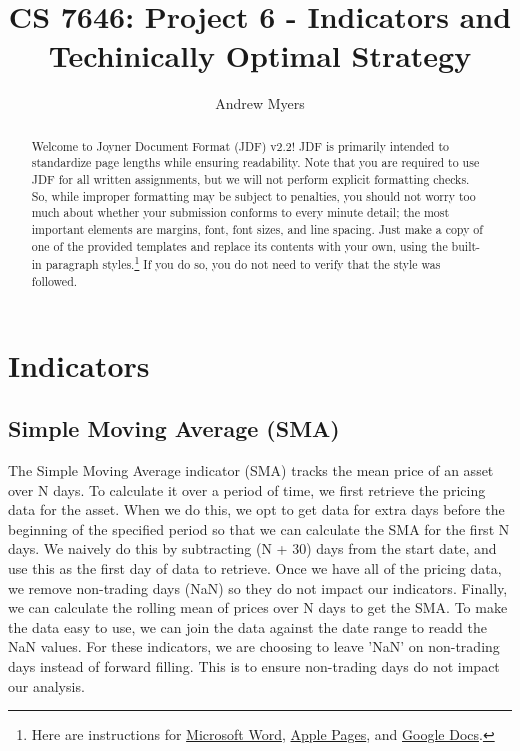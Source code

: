\documentclass[
	letterpaper, %
]{jdf}
\author{Andrew Myers}
\title{CS 7646: Project 6 - Indicators and Techinically Optimal Strategy}
\begin{document}

\maketitle

\begin{abstract}
	Welcome to Joyner Document Format (JDF) v2.2! JDF is primarily intended to standardize page lengths while ensuring readability. 
	Note that you are required to use JDF for all written assignments, but we will not perform explicit formatting checks. 
	So, while improper formatting may be subject to penalties, you should not worry too much about whether your submission conforms to 
	every minute detail; the most important elements are margins, font, font sizes, and line spacing. Just make a copy of one of the provided templates 
	and replace its contents with your own, using the built-in paragraph styles.\footnote{Here are instructions for 
	\href{https://support.office.com/en-us/article/Video-Using-Styles-in-Word-9db4c0f4-2754-4294-9758-c14a0abd8cfa}{Microsoft Word}, 
	\href{https://support.apple.com/guide/pages/intro-to-paragraph-styles-tanaa39b0aa3/mac}{Apple Pages}, and 
	\href{https://www.bazroberts.com/2016/04/19/google-docs-paragraph-styles-headings/}{Google Docs}.} If you do so, you do not need to verify that the style was followed.
\end{abstract}

\section{Indicators}
\subsection{Simple Moving Average (SMA)}
The Simple Moving Average indicator (SMA) tracks the mean price of an asset over N days. To calculate it over a period of time, we first retrieve the pricing data for the asset.
When we do this, we opt to get data for extra days before the beginning of the specified period so that we can calculate the SMA for the first N days. 
We naively do this by subtracting (N + 30) days from the start date, and use this as the first day of data to retrieve.
Once we have all of the pricing data, we remove non-trading days (NaN) so they do not impact our indicators.
Finally, we can calculate the rolling mean of prices over N days to get the SMA. To make the data easy to use, we can join the data against the date range to readd the NaN values.
For these indicators, we are choosing to leave 'NaN' on non-trading days instead of forward filling. This is to ensure non-trading days do not impact our analysis.
\end{document}
